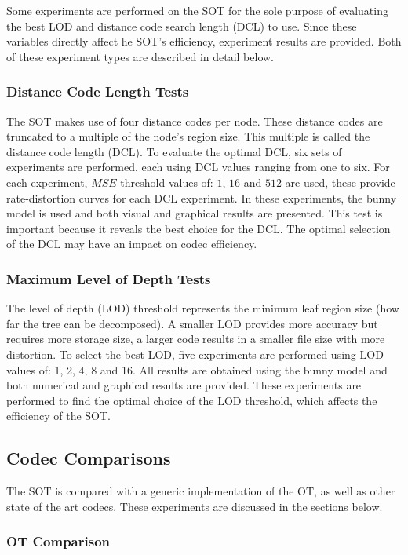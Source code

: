 Some experiments are performed on the SOT for the sole purpose of evaluating the best LOD and distance code search length (DCL) to use. Since these variables directly affect he SOT's efficiency, experiment results are provided. Both of these experiment types are described in detail below.


\subsubsection{Distance Code Length Tests}

The SOT makes use of four distance codes per node. These distance codes are truncated to a multiple of the node's region size. This multiple is called the distance code length (DCL). To evaluate the optimal DCL, six sets of experiments are performed, each using DCL values ranging from one to six. For each experiment, $MSE$ threshold values of: $1$, $16$ and $512$ are used, these provide rate-distortion curves for each DCL experiment. In these experiments, the bunny model is used and both visual and graphical results are presented. This test is important because it reveals the best choice for the DCL. The optimal selection of the DCL may have an impact on codec efficiency. 

\subsubsection{Maximum Level of Depth Tests}

The level of depth (LOD) threshold represents the minimum leaf region size (how far the tree can be decomposed). A smaller LOD provides more accuracy but requires more storage size, a larger code results in a smaller file size with more distortion. To select the best LOD, five experiments are performed using LOD values of: 1, 2, 4, 8 and 16. All results are obtained using the bunny model and both numerical and graphical results are provided. These experiments are performed to find the optimal choice of the LOD threshold, which affects the efficiency of the SOT. 

\subsection{Codec Comparisons}

The SOT is compared with a generic implementation of the OT, as well as other state of the art codecs. These experiments are discussed in the sections below.


\subsubsection{OT Comparison}

